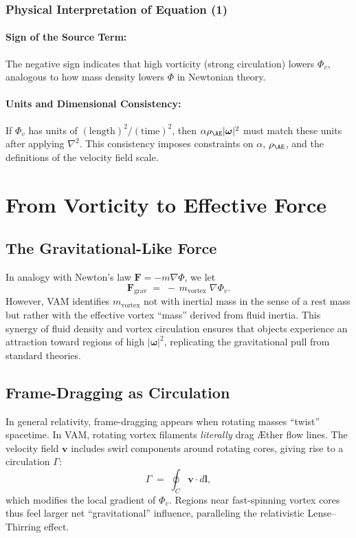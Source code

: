 \documentclass[aps,preprint,superscriptaddress]{revtex4-2}
\begin{document}
    \subsubsection{Physical Interpretation of Equation (1)}

    \paragraph{Sign of the Source Term:} The negative sign indicates that high vorticity (strong circulation) lowers \(\Phi_v\), analogous to how mass density lowers \(\Phi\) in Newtonian theory.

    \paragraph{Units and Dimensional Consistency:} If \(\Phi_v\) has units of \((\text{length})^2/(\text{time})^2\), then \(\alpha \rho_{\mathrm{\AE}} \lvert \boldsymbol{\omega} \rvert^2\) must match these units after applying \(\nabla^2\). This consistency imposes constraints on \(\alpha\), \(\rho_{\mathrm{\AE}}\), and the definitions of the velocity field scale.

    \section{From Vorticity to Effective Force}

    \subsection{The Gravitational-Like Force}

    In analogy with Newton’s law \(\mathbf{F} = -m \nabla \Phi\), we let
    \[
        \mathbf{F}_{\mathrm{grav}} \;=\; -\,m_{\mathrm{vortex}}\;\nabla \Phi_v.
    \]
    However, VAM identifies \(m_{\mathrm{vortex}}\) not with inertial mass in the sense of a rest mass but rather with the effective vortex “mass” derived from fluid inertia. This synergy of fluid density and vortex circulation ensures that objects experience an attraction toward regions of high \(\lvert \boldsymbol{\omega} \rvert^2\), replicating the gravitational pull from standard theories.

    \subsection{Frame-Dragging as Circulation}

    In general relativity, frame-dragging appears when rotating masses “twist” spacetime. In VAM, rotating vortex filaments \textit{literally} drag Æther flow lines. The velocity field \(\mathbf{v}\) includes swirl components around rotating cores, giving rise to a circulation \(\Gamma\):
    \[
        \Gamma \;=\; \oint_C \mathbf{v}\cdot d\mathbf{l},
    \]
    which modifies the local gradient of \(\Phi_v\). Regions near fast-spinning vortex cores thus feel larger net “gravitational” influence, paralleling the relativistic Lense–Thirring effect.
\end{document}
